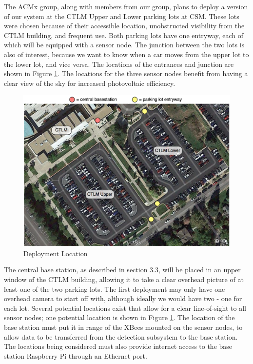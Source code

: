 \documentclass[11pt, oneside, fullpage, doublespace]{article}
\begin{document}
The ACMx group, along with members from our group, plans to deploy a version of our system at the CTLM Upper and Lower parking lots at CSM. These lots were chosen because of their accessible location, unobstructed visibility from the CTLM building, and frequent use. Both parking lots have one entryway, each of which will be equipped with a sensor node. The junction between the two lots is also of interest, because we want to know when a car moves from the upper lot to the lower lot, and vice versa. The locations of the entrances and junction are shown in Figure \ref{fig:deployment}. The locations for the three sensor nodes benefit from having a clear view of the sky for increased photovoltaic efficiency.

\begin{figure}
\begin{center}
\includegraphics[width=5in]{deployment}
\end{center}
\caption{Deployment Location}
\label{fig:deployment}
\end{figure}

The central base station, as described in section 3.3, will be placed in an upper window of the CTLM building, allowing it to take a clear overhead picture of at least one of the two parking lots. The first deployment may only have one overhead camera to start off with, although ideally we would have two - one for each lot. Several potential locations exist that allow for a clear line-of-sight to all sensor nodes; one potential location is shown in Figure \ref{fig:deployment}. The location of the base station must put it in range of the XBees mounted on the sensor nodes, to allow data to be transferred from the detection subsystem to the base station. The locations being considered must also provide internet access to the base station Raspberry Pi through an Ethernet port.
\end{document}
